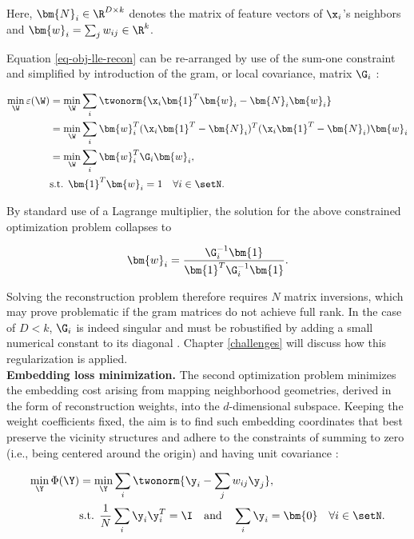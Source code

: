 Here, $\bm{N}_i \in \R^{D \times k}$ denotes the matrix of feature vectors of
$\x_i$'s neighbors and $\bm{w}_i = \sum_j w_{ij} \in \R^k$.

Equation \ref{eq-obj-lle-recon} can be re-arranged by use of the sum-one
constraint and simplified by introduction of the gram, or local covariance,
matrix $\G_i$ \citep{saulroweis2001}:

\begin{equation}
  \begin{split}
    \min_{\W} \varepsilon(\W) &= \min_{\W} \sum_i \twonorm{\x_i \bm{1}^T
    \bm{w}_i - \bm{N}_i \bm{w}_i} \\
    &= \min_{\W} \sum_i \bm{w}_i^T (\x_i \bm{1}^T - \bm{N}_i)^T
    (\x_i \bm{1}^T - \bm{N}_i) \bm{w}_i \\
    &= \min_{\W} \sum_i \bm{w}_i^T \G_i \bm{w}_i, \\
    & \text{s.t. } \bm{1}^T \bm{w}_i = 1 \quad \forall i \in \setN.
  \end{split}
  \label{eq-obj-lle-recon-2}
\end{equation}

By standard use of a Lagrange multiplier, the solution for the above constrained optimization problem collapses to

\begin{equation}
  \bm{w}_i = \frac{\G_i^{-1}\bm{1}}{\bm{1}^T \G_i^{-1}\bm{1}}.
  \label{eq-obj-lle-sol}
\end{equation}

Solving the reconstruction problem therefore requires $N$ matrix inversions, 
which may prove problematic if the gram matrices do not achieve full rank.
In the case of $D < k$, $\G_i$ is indeed singular and must be robustified by 
adding a small numerical constant to its diagonal \citep{ghojoghetal2020}.
Chapter \ref{challenges} will discuss how this regularization is applied.
\\

\textbf{Embedding loss minimization.}
The second optimization problem minimizes the embedding cost arising from 
mapping neighborhood geometries, derived in the form of reconstruction 
weights, into the $d$-dimensional subspace.
Keeping the weight coefficients fixed, the aim is to find such embedding 
coordinates that best preserve the vicinity structures and adhere to the 
constraints of summing to zero (i.e., being centered around the origin) and 
having unit covariance \citep{roweissaul2000}:

\begin{equation}
  \begin{split}
    \min_{\Y} \Phi(\Y) &= \min_{\Y} \sum_i \twonorm{\y_i - \sum_j w_{ij} \y_j}, 
    \\
    & \text{s.t. } \frac{1}{N} \sum_i \y_i \y_i^T = \I \quad \text{and}
    \quad \sum_i \y_i = \bm{0} \quad \forall i \in \setN.
  \end{split}
  \label{eq-obj-lle-emb}
\end{equation}


